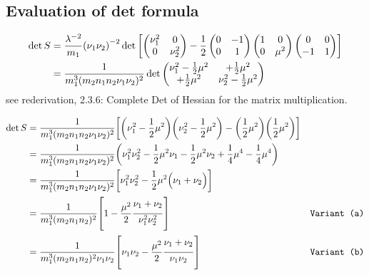 \documentclass[
	english,
	a4paper,
	fontsize=10pt,
	parskip=half,
	titlepage=true,
	DIV=12,
	final
]{scrreprt}
\begin{document}
\subsection{Evaluation of det formula}

\begin{align}
	\det S
&=
	\frac{ \lambda^{-2} }{ m_1 }
	\qty( \nu_1 \nu_2 )^{-2}
	\det\qty[
		\begin{pmatrix}
			\nu_1^2 & 0 \\
			0 & \nu_2^2
		\end{pmatrix}
		-
		\frac{1}{2}
		\begin{pmatrix}
			 0 & -1 \\
			 0 &  1
		\end{pmatrix}
		\begin{pmatrix}
			1 & 0 \\
			0 & \mu^2
		\end{pmatrix}
		\begin{pmatrix}
			 0 &  0 \\
			-1 &  1
		\end{pmatrix}
	] \\
&=
	\frac{1}{m_1^3 (m_2 n_1 n_2 \nu_1 \nu_2)^2}
	\det \begin{pmatrix}
		\nu_1^2 - \frac{1}{2} \mu^2	& + \frac{1}{2} \mu^2 \\
		+ \frac{1}{2} \mu^2					& \nu_2^2 - \frac{1}{2} \mu^2
	\end{pmatrix}
\end{align}
see rederivation, 2.3.6: Complete Det of Hessian for the matrix multiplication.

\begin{align*}
	\det S
&=
	\frac{1}{m_1^3 (m_2 n_1 n_2 \nu_1 \nu_2)^2} \qty[
	\qty(\nu_1^2 - \frac{1}{2} \mu^2)
	\qty(\nu_2^2 - \frac{1}{2} \mu^2)
	-
	\qty(\frac{1}{2} \mu^2)
	\qty(\frac{1}{2} \mu^2) ] \\
&=
	\frac{1}{m_1^3 (m_2 n_1 n_2 \nu_1 \nu_2)^2}
	\qty(
		  \nu_1^2 \nu_2^2
		- \frac{1}{2} \mu^2 \nu_1
		- \frac{1}{2} \mu^2 \nu_2
		+ \frac{1}{4} \mu^4
		- \frac{1}{4} \mu^4
	) \\
&=
	\frac{1}{m_1^3 (m_2 n_1 n_2 \nu_1 \nu_2)^2}
	\qty[
		  \nu_1^2 \nu_2^2
		- \frac{1}{2} \mu^2 \qty(\Big. \nu_1 + \nu_2)
	] \\
&=
	\frac{1}{m_1^3 (m_2 n_1 n_2)^2}
	\qty[
		  1
		- \frac{\mu^2}{2} \frac{\Big. \nu_1 + \nu_2}{\nu_1^2 \nu_2^2}
	]
	& \texttt{Variant (a)} \\
&=
	\frac{1}{m_1^3 (m_2 n_1 n_2)^2 \nu_1 \nu_2}
	\qty[
		  \nu_1 \nu_2
		- \frac{\mu^2}{2} \frac{\Big. \nu_1 + \nu_2}{\nu_1 \nu_2}
	]
	& \texttt{Variant (b)}
\end{align*}
\end{document}
